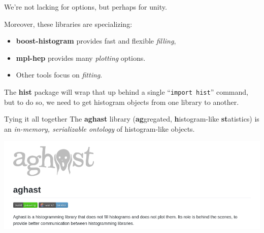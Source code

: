 \documentclass[aspectratio=169]{beamer}
\begin{document}
\begin{frame}{}
\vspace{1 cm}
\Large
\begin{center}
We're not lacking for options, but perhaps for unity.
\end{center}
\end{frame}

\begin{frame}{}
\large
\vspace{0.75 cm}
Moreover, these libraries are specializing:

\vspace{0.35 cm}
\begin{itemize}
\item {\bf boost-histogram} provides fast and flexible {\it filling},
\item {\bf mpl-hep} provides many {\it plotting} options.
\item Other tools focus on {\it fitting}.
\end{itemize}

\vspace{0.35 cm}
The {\bf hist} package will wrap that up behind a single ``\texttt{import hist}'' command, but to do so, we need to get histogram objects from one library to another.
\end{frame}

\begin{frame}{Tying it all together}
\large
\vspace{0.5 cm}
The {\bf aghast} library ({\bf ag}gregated, {\bf h}istogram-like {\bf st}atistics) is an {\it in-memory, serializable ontology} of histogram-like objects.

\vspace{0.75 cm}
\includegraphics[width=\linewidth]{aghast-github.png}
\end{frame}
\end{document}

